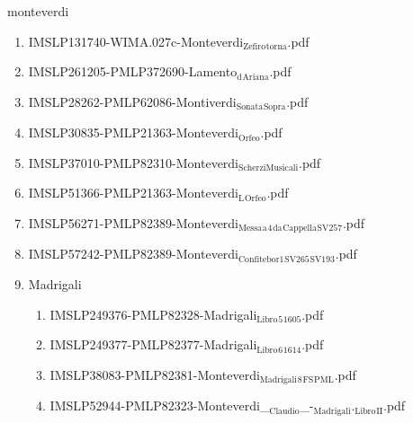 \documentclass[11pt]{article}
\begin{document}
\item monteverdi
\label{sec-1-1-1-1-44-48}
\begin{enumerate}
\item IMSLP131740-WIMA.027c-Monteverdi$_{\text{Zefiro}}$$_{\text{torna}}$.pdf
\label{sec-1-1-1-1-44-48-1}

\item IMSLP261205-PMLP372690-Lamento$_{\text{d}}$$_{\text{Ariana}}$.pdf
\label{sec-1-1-1-1-44-48-2}

\item IMSLP28262-PMLP62086-Montiverdi$_{\text{Sonata}}$$_{\text{Sopra}}$.pdf
\label{sec-1-1-1-1-44-48-3}

\item IMSLP30835-PMLP21363-Monteverdi$_{\text{Orfeo}}$.pdf
\label{sec-1-1-1-1-44-48-4}

\item IMSLP37010-PMLP82310-Monteverdi$_{\text{ScherziMusicali}}$.pdf
\label{sec-1-1-1-1-44-48-5}

\item IMSLP51366-PMLP21363-Monteverdi$_{\text{L}}$$_{\text{Orfeo}}$.pdf
\label{sec-1-1-1-1-44-48-6}

\item IMSLP56271-PMLP82389-Monteverdi$_{\text{Messa}}$$_{\text{a}}$$_{\text{4}}$$_{\text{da}}$$_{\text{Cappella}}$$_{\text{SV257}}$.pdf
\label{sec-1-1-1-1-44-48-7}

\item IMSLP57242-PMLP82389-Monteverdi$_{\text{Confitebor1}}$$_{\text{SV265}}$$_{\text{SV193}}$.pdf
\label{sec-1-1-1-1-44-48-8}

\item Madrigali
\label{sec-1-1-1-1-44-48-9}
\begin{enumerate}
\item IMSLP249376-PMLP82328-Madrigali$_{\text{Libro}}$$_{\text{5}}$$_{\text{1605}}$.pdf
\label{sec-1-1-1-1-44-48-9-1}

\item IMSLP249377-PMLP82377-Madrigali$_{\text{Libro}}$$_{\text{6}}$$_{\text{1614}}$.pdf
\label{sec-1-1-1-1-44-48-9-2}

\item IMSLP38083-PMLP82381-Monteverdi$_{\text{Madrigali}}$$_{\text{8}}$$_{\text{FS}}$$_{\text{PML}}$.pdf
\label{sec-1-1-1-1-44-48-9-3}

\item IMSLP52944-PMLP82323-Monteverdi\_$_{\text{Claudio}}$\_-$_{\text{Madrigali}}$.$_{\text{Libro}}$$_{\text{II}}$.pdf
\label{sec-1-1-1-1-44-48-9-4}


\end{enumerate}
\end{enumerate}
\end{document}
